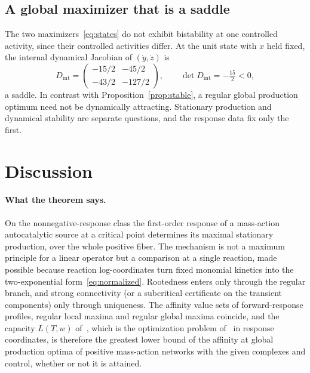 \documentclass[11pt,a4paper]{article}
\theoremstyle{plain}
\theoremstyle{definition}
\theoremstyle{remark}
\numberwithin{equation}{section}
\newcommand{\Dint}{D_{\mathrm{int}}}
\begin{document}
\subsection{A global maximizer that is a saddle}
The two maximizers~\eqref{eq:states} do not exhibit bistability at one controlled activity, since their controlled activities differ. At the unit state with $x$ held fixed, the internal dynamical Jacobian of $(\dot y,\dot z)$ is
\begin{equation}\label{eq:saddle}
 \Dint=\begin{pmatrix}-15/2&-45/2\\-43/2&-127/2\end{pmatrix},\qquad\det\Dint=-\tfrac{15}{2}<0,
\end{equation}
a saddle. In contrast with Proposition~\ref{prop:stable}, a regular global production optimum need not be dynamically attracting. Stationary production and dynamical stability are separate questions, and the response data fix only the first.

\section{Discussion}\label{sec:discussion}

\paragraph{What the theorem says.}
On the nonnegative-response class the first-order response of a mass-action autocatalytic source at a critical point determines its maximal stationary production, over the whole positive fiber. The mechanism is not a maximum principle for a linear operator but a comparison at a single reaction, made possible because reaction log-coordinates turn fixed monomial kinetics into the two-exponential form~\eqref{eq:normalized}. Rootedness enters only through the regular branch, and strong connectivity (or a subcritical certificate on the transient components) only through uniqueness. The affinity value sets of forward-response profiles, regular local maxima and regular global maxima coincide, and the capacity $L(T,w)$ of~\citep{companion2026}, which is the optimization problem of~\citep[Supplementary Note~11]{despons2024} in response coordinates, is therefore the greatest lower bound of the affinity at global production optima of positive mass-action networks with the given complexes and control, whether or not it is attained.
\end{document}
